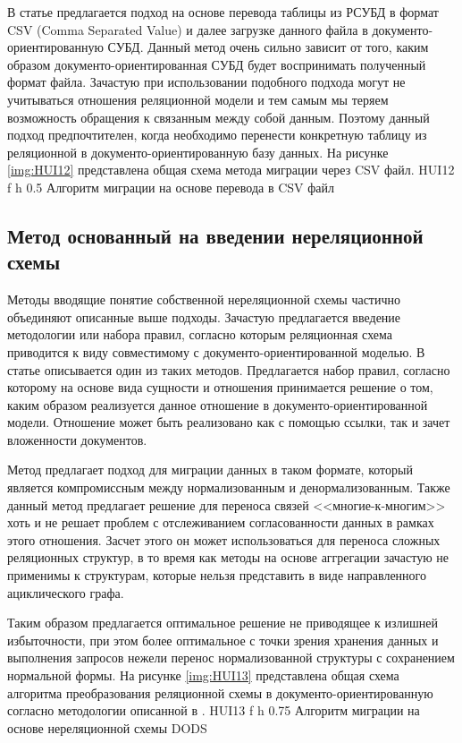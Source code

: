 \clearpage
В статье \cite{csv} предлагается подход на основе перевода таблицы из РСУБД в формат CSV (Comma Separated Value) и далее загрузке данного файла в документо-ориентированную СУБД.
Данный метод очень сильно зависит от того, каким образом документо-ориентированная СУБД будет воспринимать полученный формат файла.
Зачастую при использовании подобного подхода могут не учитываться отношения реляционной модели и тем самым мы теряем возможность обращения к связанным между собой данным.
Поэтому данный подход предпочтителен, когда необходимо перенести конкретную таблицу из реляционной в документо-ориентированную базу данных.
На рисунке \ref{img:HUI12} представлена общая схема метода миграции через CSV файл.
    {HUI12} %
    {f} %
    {h} %
    {0.5\textwidth} %
    {Алгоритм миграции на основе перевода в CSV файл} %

\clearpage

\subsection{Метод основанный на введении нереляционной схемы}
Методы вводящие понятие собственной нереляционной схемы частично объединяют описанные выше подходы.
Зачастую предлагается введение методологии или набора правил,
согласно которым реляционная схема приводится к виду совместимому с документо-ориентированной моделью.
В статье \cite{DODS} описывается один из таких методов.
Предлагается набор правил, согласно которому на основе вида сущности и отношения принимается решение о том, каким образом реализуется данное отношение в документо-ориентированной модели.
Отношение может быть реализовано как с помощью ссылки, так и зачет вложенности документов.



Метод предлагает подход для миграции данных в таком формате, который является компромиссным между нормализованным и денормализованным.
Также данный метод предлагает решение для переноса связей <<многие-к-многим>> хоть и не решает проблем с отслеживанием согласованности данных в рамках этого отношения. 
Засчет этого он может использоваться для переноса сложных реляционных структур, в то время как методы на основе аггрегации зачастую не применимы к структурам,
которые нельзя представить в виде направленного ациклического графа. 

Таким образом предлагается оптимальное решение не приводящее к излишней избыточности,
при этом более оптимальное с точки зрения хранения данных и выполнения запросов нежели перенос нормализованной структуры с сохранением нормальной формы.
\clearpage
На рисунке \ref{img:HUI13} представлена общая схема алгоритма преобразования реляционной схемы в документо-ориентированную согласно методологии описанной в \cite{DODS}.
    {HUI13} %
    {f} %
    {h} %
    {0.75\textwidth} %
    {Алгоритм миграции на основе нереляционной схемы DODS} %


